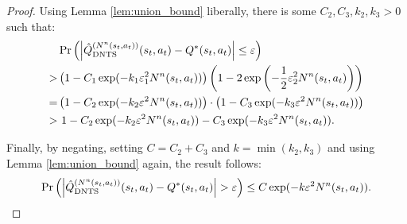 \begin{proof}
        Using Lemma \ref{lem:union_bound} liberally, there is some $C_2,C_3,k_2,k_3>0$ such that:
        \begin{align}
            &\Pr\left(\left| {\hat{Q}^{(N^n(s_t,a_t))}_{{\textnormal{DNTS}}}}(s_t,a_t) - Q^*(s_t,a_t) \right| \leq \varepsilon \right) \\
                >& \left(1-C_1\exp(-k_1\varepsilon_1^2 N^n(s_t,a_t))\right) 
                    \left(1-2\exp\left(-\frac{1}{2}\varepsilon_2^2 N^n(s_t,a_t) \right)\right) \\
                =& \left(1-C_2\exp(-k_2 \varepsilon^2 N^n(s_t,a_t)) \right)
                    \cdot \left(1-C_3\exp(-k_3 \varepsilon^2 N^n(s_t,a_t))\right) \\
                >&\ 1 -C_2\exp(-k_2 \varepsilon^2 N^n(s_t,a_t)) -C_3\exp(-k_3 \varepsilon^2 N^n(s_t,a_t)).
        \end{align}
        
        Finally, by negating, setting $C=C_2+C_3$ and $k=\min(k_2,k_3)$ and using Lemma \ref{lem:union_bound} again, the result follows:
        \begin{align}
                \Pr\left(\left| {\hat{Q}^{(N^n(s_t,a_t))}_{{\textnormal{DNTS}}}}(s_t,a_t) - Q^*(s_t,a_t) \right| > \varepsilon \right) \leq C\exp(-k\varepsilon^2 N^n(s_t,a_t)).
        \end{align}
    \end{proof}

    \proofsep








